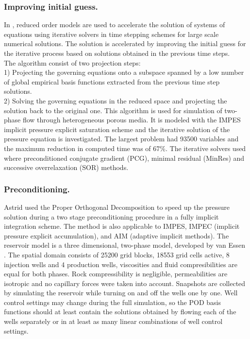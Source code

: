 \documentclass[12pt]{report}
\begin{document}
\subsubsection{Improving initial guess.}
In \cite{Mark06}, reduced order models are used to accelerate the solution of 
systems of equations using iterative solvers in time stepping schemes for large scale numerical solutions. 
The solution is accelerated by improving the initial guess for the iterative process based on solutions obtained
in the previous time steps. \\
The algorithm consist of two projection steps:\\
1) Projecting the governing equations onto a subspace spanned by a low number of global empirical basis 
functions extracted from the previous time step solutions.\\
2) Solving the governing equations in the reduced space and projecting the solution back to the original one.
This algorithm is used for simulation of two-phase flow through heterogeneous porous media. It is modeled with the 
IMPES implicit pressure explicit saturation scheme and the iterative solution of the pressure 
equation is investigated. 
The largest problem had 93500
variables and the maximum reduction in computed time was of 67\%. 
The iterative solvers used where preconditioned conjugate gradient (PCG), minimal residual (MinRes) and 
successive overrelaxation (SOR) methods.

\subsubsection{Preconditioning.}
Astrid \cite{Astrid11} used the Proper Orthogonal Decomposition to speed up the pressure solution 
during a two stage 
preconditioning procedure in a fully implicit integration scheme. The method is also applicable to IMPES, 
IMPEC (implicit pressure explicit accumulation), and AIM (adaptive implicit methods). 
The reservoir model is a three dimensional, two-phase model, developed by van Essen \cite{vanEssen09}.
The spatial domain consists of 25200 grid blocks, 18553 grid cells active, 8 injection wells and 4 production
wells, viscosities and fluid compresibilities are equal for both phases. Rock compressibility is negligible, 
permeabilities are isotropic and no capillary forces were taken into account. 
Snapshots are collected by simulating the reservoir while turning on and off the wells one by one. 
Well control settings may change during the full simulation, so the POD basis functions should at 
least contain the solutions obtained by flowing each of the wells separately or in at least 
as many linear combinations of well control settings. \\
\end{document}
